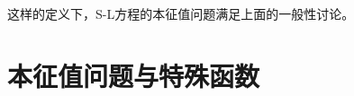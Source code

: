 \documentclass[12pt,a4paper]{article}
\renewcommand{\[}{\ $\displaystyle}
\renewcommand{\]}{$\ }%
\begin{document}
		这样的定义下，S-L方程的本征值问题满足上面的一般性讨论。
%		
%		
	
\section{本征值问题与特殊函数}	
\end{document}
